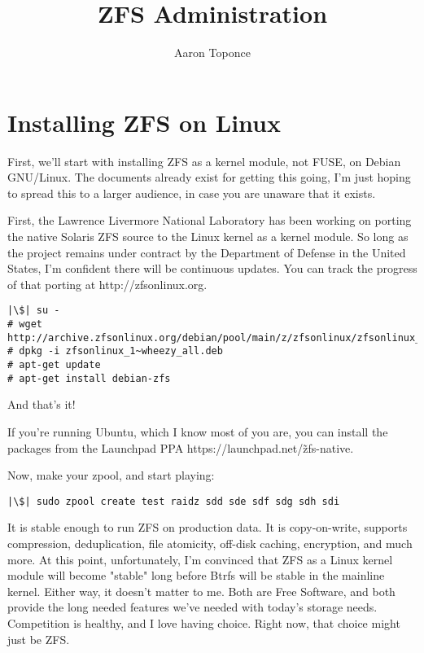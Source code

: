 \documentclass[landscape]{book}
\begin{document}
\begin{titlepage}
\title{ZFS Administration}
\author{Aaron Toponce}
\maketitle
\end{titlepage}

\chapter{Installing ZFS on Linux}
First, we'll start with installing ZFS as a kernel module, not FUSE, on
Debian GNU/Linux. The documents already exist for getting this going, I'm
just hoping to spread this to a larger audience, in case you are unaware
that it exists.

First, the Lawrence Livermore National Laboratory has been working on
porting the native Solaris ZFS source to the Linux kernel as a kernel
module. So long as the project remains under contract by the Department of
Defense in the United States, I'm confident there will be continuous
updates. You can track the progress of that porting at
http://zfsonlinux.org.

\begin{lstlisting}
|\$| su -
# wget http://archive.zfsonlinux.org/debian/pool/main/z/zfsonlinux/zfsonlinux_1%7Ewheezy_all.deb
# dpkg -i zfsonlinux_1~wheezy_all.deb
# apt-get update
# apt-get install debian-zfs
\end{lstlisting}

And that's it!

If you're running Ubuntu, which I know most of you are, you can install the
packages from the Launchpad PPA https://launchpad.net/\~zfs-native.

Now, make your zpool, and start playing:

\begin{lstlisting}
|\$| sudo zpool create test raidz sdd sde sdf sdg sdh sdi
\end{lstlisting}

It is stable enough to run ZFS on production data. It is copy-on-write,
supports compression, deduplication, file atomicity, off-disk caching,
encryption, and much more. At this point, unfortunately, I'm convinced that
ZFS as a Linux kernel module will become "stable" long before Btrfs will be
stable in the mainline kernel. Either way, it doesn't matter to me. Both
are Free Software, and both provide the long needed features we've needed
with today's storage needs. Competition is healthy, and I love having
choice. Right now, that choice might just be ZFS.
\end{document}
